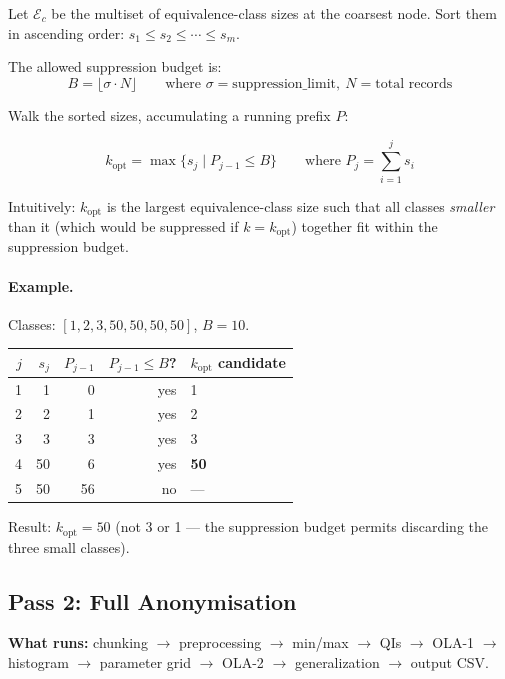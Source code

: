\documentclass[12pt,a4paper]{article}
\begin{document}
Let $\mathcal{E}_c$ be the multiset of equivalence-class sizes at the coarsest
node. Sort them in ascending order:
$s_1 \leq s_2 \leq \cdots \leq s_m$.

The allowed suppression budget is:
\[
  B = \lfloor \sigma \cdot N \rfloor
  \qquad \text{where } \sigma = \text{suppression\_limit},\ N = \text{total records}
\]

Walk the sorted sizes, accumulating a running prefix $P$:

\begin{equation}
  k_{\text{opt}} = \max\bigl\{s_j \mid P_{j-1} \leq B\bigr\}
  \qquad\text{where }P_j = \sum_{i=1}^{j} s_i
\end{equation}

Intuitively: $k_{\text{opt}}$ is the largest equivalence-class size such that
all classes \emph{smaller} than it (which would be suppressed if $k =
k_{\text{opt}}$) together fit within the suppression budget.

\paragraph{Example.} Classes: $[1, 2, 3, 50, 50, 50, 50]$, $B = 10$.

\begin{table}[H]
\centering
\begin{tabular}{rrrrl}
\toprule
$j$ & $s_j$ & $P_{j-1}$ & $P_{j-1} \leq B$? & $k_{\text{opt}}$ candidate \\
\midrule
1 & 1  & 0  & yes & 1 \\
2 & 2  & 1  & yes & 2 \\
3 & 3  & 3  & yes & 3 \\
4 & 50 & 6  & yes & \textbf{50} \\
5 & 50 & 56 & no  & — \\
\bottomrule
\end{tabular}
\end{table}

Result: $k_{\text{opt}} = 50$ (not 3 or 1 — the suppression budget permits
discarding the three small classes).

\subsection{Pass 2: Full Anonymisation}

\textbf{What runs:} chunking $\to$ preprocessing $\to$ min/max $\to$ QIs $\to$
OLA-1 $\to$ histogram $\to$ parameter grid $\to$ OLA-2 $\to$
generalization $\to$ output CSV.
\end{document}
